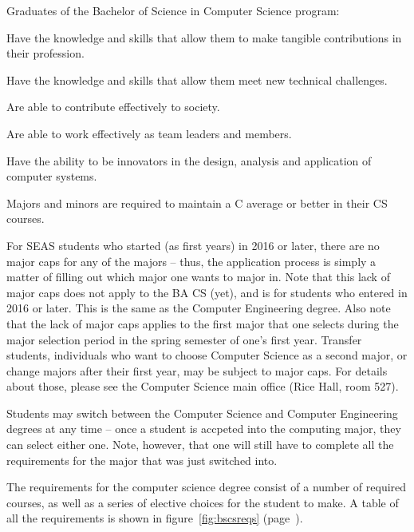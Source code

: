 Graduates of the Bachelor of Science in Computer Science program:

\begin{itemlist}
\item Have the knowledge and skills that allow them to make tangible contributions in their profession.
\item Have the knowledge and skills that allow them meet new technical challenges.
\item Are able to contribute effectively to society.
\item Are able to work effectively as team leaders and members.
\item Have the ability to be innovators in the design, analysis and application of computer systems. 
\end{itemlist}

 Majors and minors are required to maintain a C average or better in their CS courses.

\label{bscsapplicationprocess}

For SEAS students who started (as first years) in 2016 or later, there
are no major caps for any of the majors -- thus, the application
process is simply a matter of filling out which major one wants to
major in.  Note that this lack of major caps does not apply to the BA
CS (yet), and is for students who entered in 2016 or later.  This is
the same as the Computer Engineering degree.  Also note that the lack
of major caps applies to the first major that one selects during the
major selection period in the spring semester of one's first year.
Transfer students, individuals who want to choose Computer Science as
a second major, or change majors after their first year, may be
subject to major caps.  For details about those, please see the
Computer Science main office (Rice Hall, room 527).

Students may switch between the Computer Science and Computer
Engineering degrees at any time -- once a student is accpeted into the
computing major, they can select either one.  Note, however, that one
will still have to complete all the requirements for the major that
was just switched into.


The requirements for the computer science degree consist of a number
of required courses, as well as a series of elective choices for the
student to make.  A table of all the requirements is shown in
figure~\ref{fig:bscsreqs} (page~\pageref{fig:bscsreqs}).

